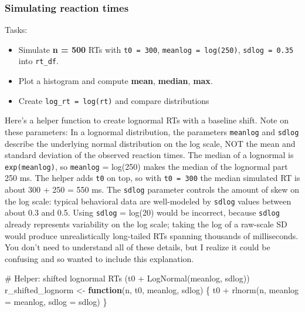 \documentclass[
  letterpaper,
  DIV=11,
  numbers=noendperiod]{scrartcl}
\newenvironment{Shaded}{\begin{snugshade}}{\end{snugshade}}
\newcommand{\AttributeTok}[1]{\textcolor[rgb]{0.40,0.45,0.13}{#1}}
\newcommand{\CommentTok}[1]{\textcolor[rgb]{0.37,0.37,0.37}{#1}}
\newcommand{\ControlFlowTok}[1]{\textcolor[rgb]{0.00,0.23,0.31}{\textbf{#1}}}
\newcommand{\FunctionTok}[1]{\textcolor[rgb]{0.28,0.35,0.67}{#1}}
\newcommand{\NormalTok}[1]{\textcolor[rgb]{0.00,0.23,0.31}{#1}}
\newcommand{\OtherTok}[1]{\textcolor[rgb]{0.00,0.23,0.31}{#1}}
\newcommand{\SpecialCharTok}[1]{\textcolor[rgb]{0.37,0.37,0.37}{#1}}
\providecommand{\tightlist}{%
  \setlength{\itemsep}{0pt}\setlength{\parskip}{0pt}}
\begin{document}
\subsubsection{Simulating reaction
times}\label{simulating-reaction-times}

Tasks:

\begin{itemize}
\tightlist
\item
  Simulate \textbf{n = 500} RTs with \texttt{t0\ =\ 300},
  \texttt{meanlog\ =\ log(250)}, \texttt{sdlog\ =\ 0.35} into
  \texttt{rt\_df}.
\item
  Plot a histogram and compute \textbf{mean}, \textbf{median},
  \textbf{max}.
\item
  Create \texttt{log\_rt\ =\ log(rt)} and compare distributions
\end{itemize}

Here's a helper function to create lognormal RTs with a baseline shift.
Note on these parameters: In a lognormal distribution, the parameters
\texttt{meanlog} and \texttt{sdlog} describe the underlying normal
distribution on the log scale, NOT the mean and standard deviation of
the observed reaction times. The median of a lognormal is
\texttt{exp(meanlog)}, so \texttt{meanlog} = log(250) makes the median
of the lognormal part 250 ms. The helper adds \texttt{t0} on top, so
with \texttt{t0\ =\ 300} the median simulated RT is about 300 + 250 =
550 ms. The \texttt{sdlog} parameter controls the amount of skew on the
log scale: typical behavioral data are well-modeled by \texttt{sdlog}
values between about 0.3 and 0.5. Using \texttt{sdlog} = log(20) would
be incorrect, because \texttt{sdlog} already represents variability on
the log scale; taking the log of a raw-scale SD would produce
unrealistically long-tailed RTs spanning thousands of milliseconds. You
don't need to understand all of these details, but I realize it could be
confusing and so wanted to include this explanation.

\begin{Shaded}
\begin{Highlighting}[]
\CommentTok{\# Helper: shifted lognormal RTs (t0 + LogNormal(meanlog, sdlog))}
\NormalTok{r\_shifted\_lognorm }\OtherTok{\textless{}{-}} \ControlFlowTok{function}\NormalTok{(n, t0, meanlog, sdlog) \{}
\NormalTok{  t0 }\SpecialCharTok{+} \FunctionTok{rlnorm}\NormalTok{(n, }\AttributeTok{meanlog =}\NormalTok{ meanlog, }\AttributeTok{sdlog =}\NormalTok{ sdlog)}
\NormalTok{\}}
\end{Highlighting}
\end{Shaded}
\end{document}
